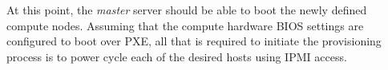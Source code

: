 At this point, the {\em master} server should be able to boot the newly defined
compute nodes. Assuming that the compute hardware BIOS settings are configured
to boot over PXE, all that is required to initiate the provisioning process is to power
cycle each of the desired hosts using IPMI access.

